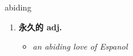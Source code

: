 
\begin{frame}
{\huge abiding}
\begin{center}
\begin{enumerate}\Large
  \item \textbf{永久的 adj.}
  \begin{itemize}
    \item \em{\Large{an abiding love of Espanol}}
  \end{itemize}
\end{enumerate}
\end{center}
\end{frame}
